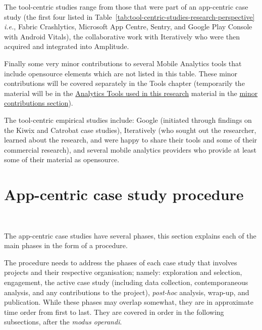 The tool-centric studies range from those that were part of an app-centric case study (the first four listed in Table~\ref{tab:tool-centric-studies-research-perspective} \textit{i.e.}, Fabric Crashlytics, Microsoft App Centre, Sentry, and Google Play Console with Android Vitals), the collaborative work with Iteratively who were then acquired and integrated into Amplitude. 

Finally some very minor contributions to several Mobile Analytics tools that include opensource elements which are not listed in this table. These minor contributions will be covered separately in the Tools chapter (temporarily the material will be in the  \href{appendix-analytics-tools}{Analytics Tools used in this research} material in the \href{tools-minor-contributions}{minor contributions section}).

The tool-centric empirical studies include: Google (initiated through findings on the Kiwix and Catrobat case studies), Iteratively (who sought out the researcher, learned about the research, and were happy to share their tools and some of their commercial research), and several mobile analytics providers who provide at least some of their material as opensource. 




\section{App-centric case study procedure}~\label{section-case-study-procedure}

The app-centric case studies have several phases, this section explains each of the main phases in the form of a procedure.

The procedure needs to address the phases of each case study that involves projects and their respective organisation; namely: exploration and selection, engagement, the active case study (including data collection, contemporaneous analysis, and any contributions to the project), \emph{post-hoc} analysis, wrap-up, and publication. While these phases may overlap somewhat, they are in approximate time order from first to last. They are covered in order in the following subsections, after the \emph{modus operandi}.

